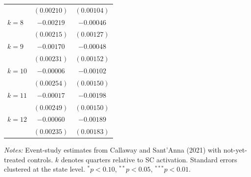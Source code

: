 \begin{table}[!htbp]
\begin{threeparttable}
\begin{tabular}{lcc}
 & $(0.00210)$ & $(0.00104)$ \\
$k = 8$ & $-0.00219$ & $-0.00046$ \\
 & $(0.00215)$ & $(0.00127)$ \\
$k = 9$ & $-0.00170$ & $-0.00048$ \\
 & $(0.00231)$ & $(0.00152)$ \\
$k = 10$ & $-0.00006$ & $-0.00102$ \\
 & $(0.00254)$ & $(0.00150)$ \\
$k = 11$ & $-0.00017$ & $-0.00198$ \\
 & $(0.00249)$ & $(0.00150)$ \\
$k = 12$ & $-0.00060$ & $-0.00189$ \\
 & $(0.00235)$ & $(0.00183)$ \\
\bottomrule
\end{tabular}
\begin{tablenotes}[flushleft]
\small
\item \textit{Notes:} Event-study estimates from Callaway and Sant'Anna (2021) with not-yet-treated controls. $k$ denotes quarters relative to SC activation. Standard errors clustered at the state level. $^{*}p<0.10$, $^{**}p<0.05$, $^{***}p<0.01$.
\end{tablenotes}
\end{threeparttable}
\end{table}
